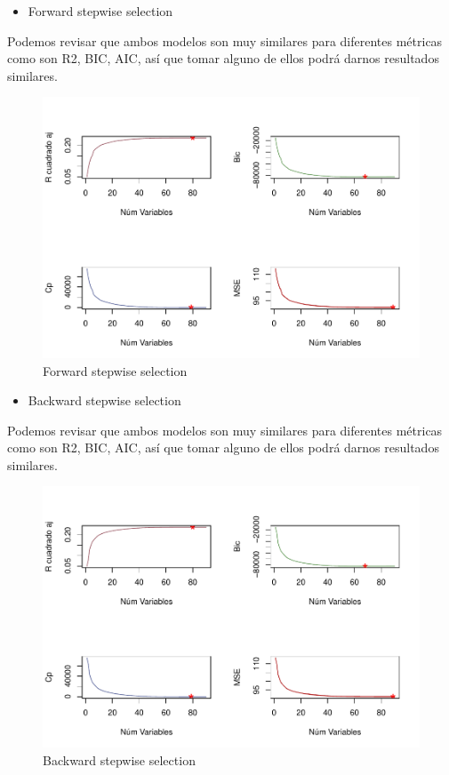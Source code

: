 \documentclass[conference,final,]{IEEEtran}
\providecommand{\tightlist}{%
  \setlength{\itemsep}{0pt}\setlength{\parskip}{0pt}}
\begin{document}
\begin{itemize}
\tightlist
\item
  Forward stepwise selection
\end{itemize}

Podemos revisar que ambos modelos son muy similares para diferentes
métricas como son R2, BIC, AIC, así que tomar alguno de ellos podrá
darnos resultados similares.

\begin{figure}[H]

{\centering \includegraphics[width=0.6\linewidth]{YearPrediction_Reporte_files/figure-latex/unnamed-chunk-5-1} 

}

\caption{Forward stepwise selection}\label{fig:unnamed-chunk-5}
\end{figure}

\begin{itemize}
\tightlist
\item
  Backward stepwise selection
\end{itemize}

Podemos revisar que ambos modelos son muy similares para diferentes
métricas como son R2, BIC, AIC, así que tomar alguno de ellos podrá
darnos resultados similares.

\begin{figure}[H]

{\centering \includegraphics[width=0.6\linewidth]{YearPrediction_Reporte_files/figure-latex/unnamed-chunk-6-1} 

}

\caption{Backward stepwise selection}\label{fig:unnamed-chunk-6}
\end{figure}
\end{document}
